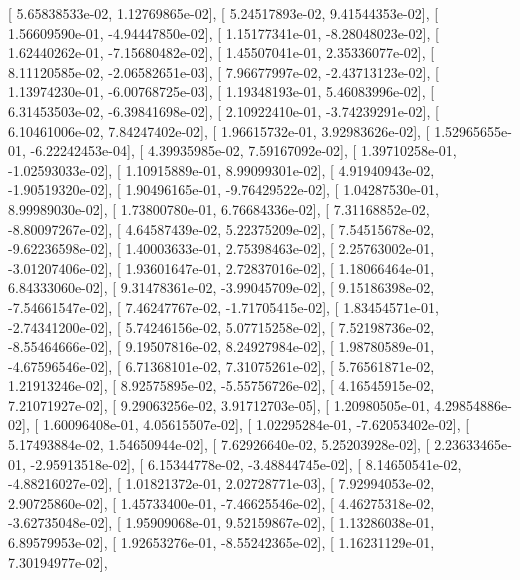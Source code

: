 \documentclass{article}
\begin{document}
       [  5.65838533e-02,   1.12769865e-02],
       [  5.24517893e-02,   9.41544353e-02],
       [  1.56609590e-01,  -4.94447850e-02],
       [  1.15177341e-01,  -8.28048023e-02],
       [  1.62440262e-01,  -7.15680482e-02],
       [  1.45507041e-01,   2.35336077e-02],
       [  8.11120585e-02,  -2.06582651e-03],
       [  7.96677997e-02,  -2.43713123e-02],
       [  1.13974230e-01,  -6.00768725e-03],
       [  1.19348193e-01,   5.46083996e-02],
       [  6.31453503e-02,  -6.39841698e-02],
       [  2.10922410e-01,  -3.74239291e-02],
       [  6.10461006e-02,   7.84247402e-02],
       [  1.96615732e-01,   3.92983626e-02],
       [  1.52965655e-01,  -6.22242453e-04],
       [  4.39935985e-02,   7.59167092e-02],
       [  1.39710258e-01,  -1.02593033e-02],
       [  1.10915889e-01,   8.99099301e-02],
       [  4.91940943e-02,  -1.90519320e-02],
       [  1.90496165e-01,  -9.76429522e-02],
       [  1.04287530e-01,   8.99989030e-02],
       [  1.73800780e-01,   6.76684336e-02],
       [  7.31168852e-02,  -8.80097267e-02],
       [  4.64587439e-02,   5.22375209e-02],
       [  7.54515678e-02,  -9.62236598e-02],
       [  1.40003633e-01,   2.75398463e-02],
       [  2.25763002e-01,  -3.01207406e-02],
       [  1.93601647e-01,   2.72837016e-02],
       [  1.18066464e-01,   6.84333060e-02],
       [  9.31478361e-02,  -3.99045709e-02],
       [  9.15186398e-02,  -7.54661547e-02],
       [  7.46247767e-02,  -1.71705415e-02],
       [  1.83454571e-01,  -2.74341200e-02],
       [  5.74246156e-02,   5.07715258e-02],
       [  7.52198736e-02,  -8.55464666e-02],
       [  9.19507816e-02,   8.24927984e-02],
       [  1.98780589e-01,  -4.67596546e-02],
       [  6.71368101e-02,   7.31075261e-02],
       [  5.76561871e-02,   1.21913246e-02],
       [  8.92575895e-02,  -5.55756726e-02],
       [  4.16545915e-02,   7.21071927e-02],
       [  9.29063256e-02,   3.91712703e-05],
       [  1.20980505e-01,   4.29854886e-02],
       [  1.60096408e-01,   4.05615507e-02],
       [  1.02295284e-01,  -7.62053402e-02],
       [  5.17493884e-02,   1.54650944e-02],
       [  7.62926640e-02,   5.25203928e-02],
       [  2.23633465e-01,  -2.95913518e-02],
       [  6.15344778e-02,  -3.48844745e-02],
       [  8.14650541e-02,  -4.88216027e-02],
       [  1.01821372e-01,   2.02728771e-03],
       [  7.92994053e-02,   2.90725860e-02],
       [  1.45733400e-01,  -7.46625546e-02],
       [  4.46275318e-02,  -3.62735048e-02],
       [  1.95909068e-01,   9.52159867e-02],
       [  1.13286038e-01,   6.89579953e-02],
       [  1.92653276e-01,  -8.55242365e-02],
       [  1.16231129e-01,   7.30194977e-02],
\end{document}
